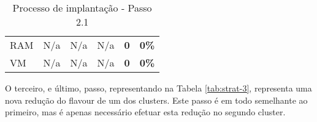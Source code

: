 \begin{table}[H]
\begin{tabular}{|l|l|l|l|l|l|}
    \cellcolor[HTML]{C0C0C0}RAM                             & N/a                                                    & N/a                                                    & N/a    & \textbf{0}    & \textbf{0\%} \\ \cline{1-6}
    \cellcolor[HTML]{C0C0C0}VM                              & N/a                                                    & N/a                                                    & N/a    & \textbf{0}    & \textbf{0\%} \\ \cline{1-6}
  \end{tabular}
  \caption{Processo de implantação - Passo 2.1}
  \label{tab:strat-2_1}
\end{table}

O terceiro, e último, passo, representando na Tabela \ref{tab:strat-3}, representa uma nova redução 
do \gls{flavour} de um dos \glspl{cluster}. Este passo é em todo semelhante ao primeiro, mas é
apenas necessário efetuar esta redução no segundo \gls{cluster}.

